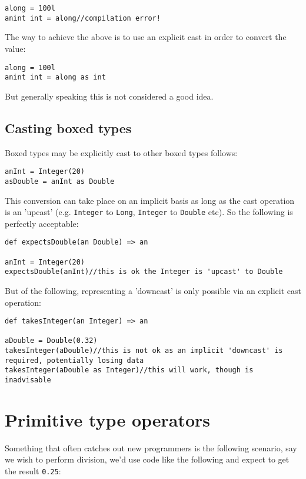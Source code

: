 \documentclass[conc-doc]{subfiles}
\begin{document}
\begin{lstlisting}
along = 100l
anint int = along//compilation error!
\end{lstlisting}

The way to achieve the above is to use an explicit cast in order to convert the value:

\begin{lstlisting}
along = 100l
anint int = along as int
\end{lstlisting}

But generally speaking this is not considered a good idea.

\subsection{Casting boxed types}
Boxed types may be explicitly cast to other boxed types follows:
\begin{lstlisting}
anInt = Integer(20)
asDouble = anInt as Double
\end{lstlisting}

This conversion can take place on an implicit basis as long as the cast operation is an 'upcast' (e.g. \lstinline{Integer} to \lstinline{Long}, \lstinline{Integer} to \lstinline{Double} etc). So the following is perfectly acceptable:
\begin{lstlisting}
def expectsDouble(an Double) => an

anInt = Integer(20)
expectsDouble(anInt)//this is ok the Integer is 'upcast' to Double
\end{lstlisting}

But of the following, representing a 'downcast' is only possible via an explicit cast operation:

\begin{lstlisting}
def takesInteger(an Integer) => an

aDouble = Double(0.32)
takesInteger(aDouble)//this is not ok as an implicit 'downcast' is required, potentially losing data
takesInteger(aDouble as Integer)//this will work, though is inadvisable
\end{lstlisting}

\section{Primitive type operators}
Something that often catches out new programmers is the following scenario, say we wish to perform division, we'd use code like the following and expect to get the result \lstinline{0.25}:
\end{document}

